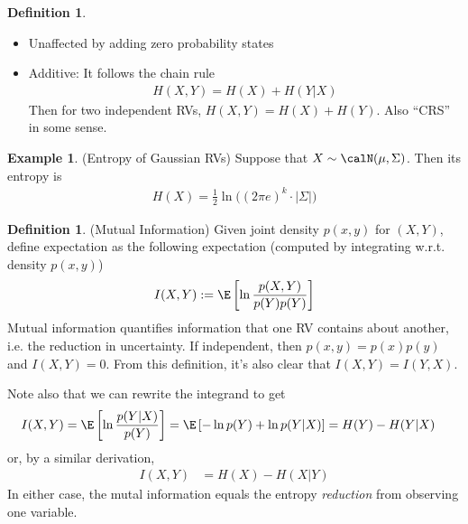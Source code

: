 \documentclass[12pt]{article}
\theoremstyle{plain}
\theoremstyle{definition}
\newtheorem{defn}[thm]{Definition}
\newtheorem{ex}[thm]{Example}
\theoremstyle{remark}
\begin{document}
\begin{defn}
\begin{itemize}
  \item Unaffected by adding zero probability states
  \item Additive:
    It follows the chain rule
    \begin{align*}
      H(X,Y) = H(X) + H(Y|X)
    \end{align*}
    Then for two independent RVs, $H(X,Y)=H(X)+H(Y)$.
    Also ``CRS'' in some sense.
\end{itemize}
\end{defn}

\begin{ex}(Entropy of Gaussian RVs)
Suppose that $X\sim\calN(\mu,\Sigma)$. Then its entropy is
\begin{align*}
  H(X)
  = \frac{1}{2}\ln\big( (2\pi e)^k \cdot|\Sigma|\big)
\end{align*}
\end{ex}

\clearpage
\begin{defn}(Mutual Information)
Given joint density $p(x,y)$ for $(X,Y)$, define expectation as the
following expectation (computed by integrating w.r.t. density $p(x,y)$)
\begin{align*}
  I(X,Y)
  := \E\left[
    \ln\frac{p(X,Y)}{p(Y)p(Y)}
  \right]
\end{align*}
Mutual information quantifies information that one RV contains about
another, i.e. the reduction in uncertainty.
If independent, then $p(x,y)=p(x)p(y)$ and $I(X,Y)=0$.
From this definition, it's also clear that $I(X,Y)=I(Y,X)$.

Note also that we can rewrite the integrand to get
\begin{align*}
  I(X,Y)
  = \E\left[
    \ln\frac{p(Y|X)}{p(Y)}
  \right]
  = \E\left[
    -\ln p(Y)
    + \ln p(Y|X)
  \right]
  &= H(Y)-H(Y|X)
\end{align*}
or, by a similar derivation,
\begin{align*}
  I(X,Y)
  &= H(X)-H(X|Y)
\end{align*}
In either case, the mutal information equals the entropy
\emph{reduction} from observing one variable.
\end{defn}
\end{document}
